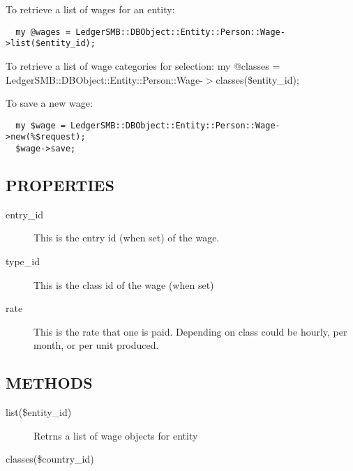 \begin{description}
\begin{description}
\begin{description}
\begin{description}
\begin{description}
\begin{description}
\begin{description}
\begin{description}
To retrieve a list of wages for an entity:

\begin{verbatim}
  my @wages = LedgerSMB::DBObject::Entity::Person::Wage->list($entity_id);
\end{verbatim}


To retrieve a list of wage categories for selection:
  my @classes = LedgerSMB::DBObject::Entity::Person::Wage-$>$classes(\$entity\_id);



To save a new wage:

\begin{verbatim}
  my $wage = LedgerSMB::DBObject::Entity::Person::Wage->new(%$request);
  $wage->save;
\end{verbatim}
\subsection*{PROPERTIES\label{LedgerSMB::DBObject::Entity::Payroll::Wage_PROPERTIES}}
\begin{description}

\item[{entry\_id}] \mbox{}

This is the entry id (when set) of the wage.


\item[{type\_id}] \mbox{}

This is the class id of the wage (when set)


\item[{rate}] \mbox{}

This is the rate that one is paid.  Depending on class could be hourly, per 
month, or per unit produced.

\end{description}
\subsection*{METHODS\label{LedgerSMB::DBObject::Entity::Payroll::Wage_METHODS}}
\begin{description}

\item[{list(\$entity\_id)}] \mbox{}

Retrns a list of wage objects for entity


\item[{classes(\$country\_id)}] \mbox{}


\end{description}
\end{description}
\end{description}
\end{description}
\end{description}
\end{description}
\end{description}
\end{description}
\end{description}
